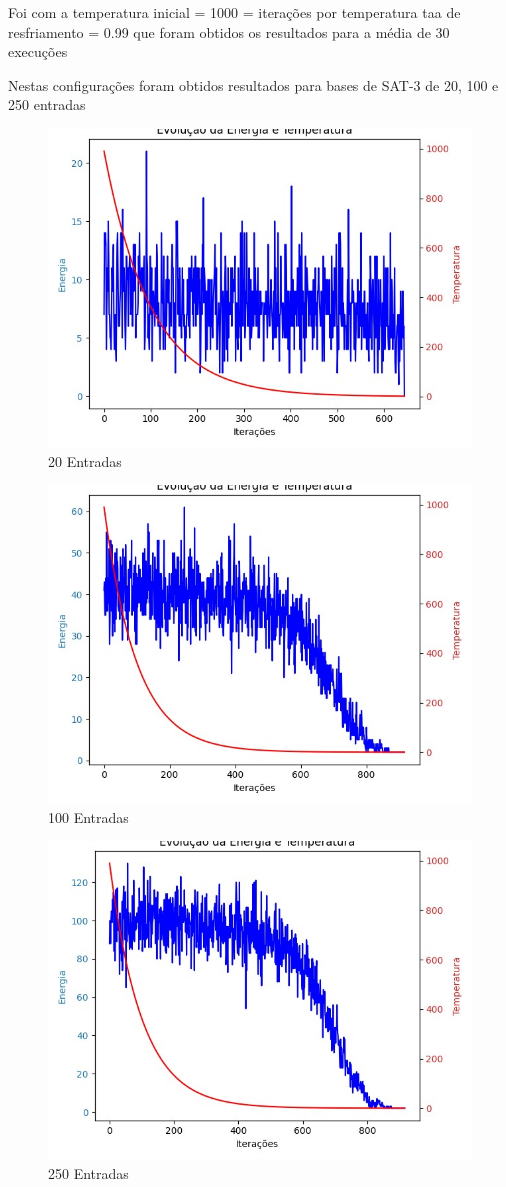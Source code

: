 \documentclass[12pt]{article}
\begin{document}

Foi com a temperatura inicial = 1000 = iterações por temperatura taa de resfriamento = 0.99 
que foram obtidos os resultados para a média de 30 execuções


Nestas configurações foram obtidos resultados para bases de SAT-3 de 20, 100 e 250 entradas %

\begin{figure}[ht!]
  \centering
  \includegraphics[width=.5\textwidth]{20_entries_plot.jpg}
  \caption{20 Entradas}
  \label{fig:metodologia}
  \end{figure}

\begin{figure}[ht!]
  \centering
  \includegraphics[width=.5\textwidth]{100_entries_plot.jpg}
  \caption{100 Entradas}
  \label{fig:metodologia}
   \end{figure}

\begin{figure}[ht!]
  \centering
  \includegraphics[width=.5\textwidth]{250_entries_plot.jpg}
  \caption{250 Entradas}
  \label{fig:metodologia}
  \end{figure}
\end{document}

